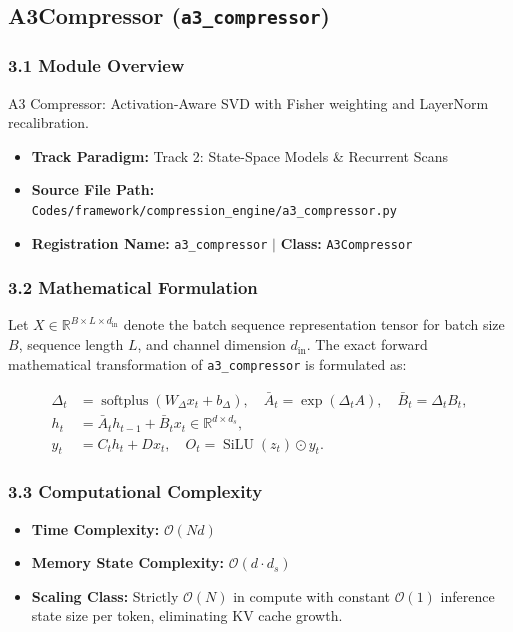 \subsection{A3Compressor (\texttt{a3\_compressor})}
\label{sec:app_module_a3\_compressor}

\subsubsection*{3.1 Module Overview}
A3 Compressor: Activation-Aware SVD with Fisher weighting and LayerNorm recalibration.
\begin{itemize}
    \item \textbf{Track Paradigm:} Track 2: State-Space Models & Recurrent Scans
    \item \textbf{Source File Path:} \texttt{Codes/framework/compression\_engine/a3\_compressor.py}
    \item \textbf{Registration Name:} \texttt{a3\_compressor} $\mid$ \textbf{Class:} \texttt{A3Compressor}
\end{itemize}

\subsubsection*{3.2 Mathematical Formulation}
Let $X \in \mathbb{R}^{B \times L \times d_{\text{in}}}$ denote the batch sequence representation tensor for batch size $B$, sequence length $L$, and channel dimension $d_{\text{in}}$. The exact forward mathematical transformation of \texttt{a3\_compressor} is formulated as:

\begin{align}
\Delta_t &= \operatorname{softplus}(W_\Delta x_t + b_\Delta), \quad \bar{A}_t = \exp(\Delta_t A), \quad \bar{B}_t = \Delta_t B_t, \\
h_t &= \bar{A}_t h_{t-1} + \bar{B}_t x_t \in \mathbb{R}^{d \times d_s}, \\
y_t &= C_t h_t + D x_t, \quad O_t = \operatorname{SiLU}(z_t) \odot y_t.
\end{align}


\subsubsection*{3.3 Computational Complexity}
\begin{itemize}
    \item \textbf{Time Complexity:} $\mathcal{O}(N d)$
    \item \textbf{Memory State Complexity:} $\mathcal{O}(d \cdot d_s)$
    \item \textbf{Scaling Class:} Strictly $\mathcal{O}(N)$ in compute with constant $\mathcal{O}(1)$ inference state size per token, eliminating KV cache growth.
\end{itemize}

